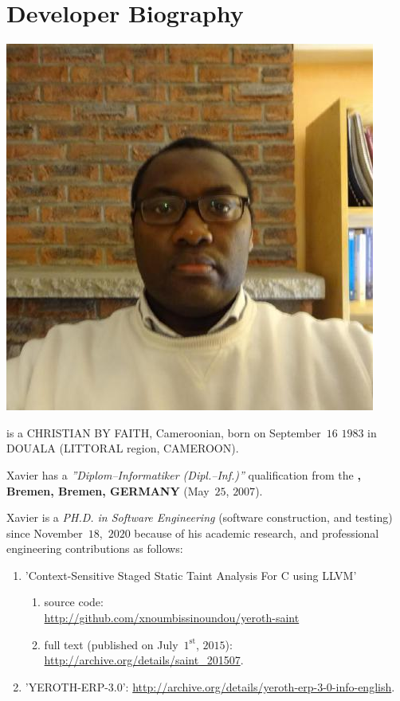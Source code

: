 \section{Developer Biography}\label{chap:biography}
\vspace{-0.9em}

\begin{center}
\includegraphics[scale=0.32]{../../francais/images/XavierNOUNDOU-2}
\end{center}

\textbf{\myfullacademicname} is a CHRISTIAN BY FAITH,
Cameroonian, born on September~$16$ $1983$ in
DOUALA (LITTORAL region, CAMEROON).

Xavier has a \textit{''Diplom--Informatiker (Dipl.--Inf.)''}
qualification from the \textbf{\unibremen, Bremen, Bremen, GERMANY} (May~$25$, $2007$).

Xavier is a \textit{PH.D. in Software Engineering}
(software construction, and testing) since November~$18$,~$2020$
because of his academic research, and professional engineering
contributions as follows:


\begin{enumerate}
	\item 'Context-Sensitive Staged Static Taint Analysis
			For C using LLVM'
		\begin{enumerate}[1.]
			\itemsep -0.7em
			\item source code: \\
			\url{http://github.com/xnoumbissinoundou/yeroth-saint}
			\item full text (published on July~$1^\text{st}$, $2015$): \url{http://archive.org/details/saint_201507}.
		\end{enumerate}		 

	\item 'YEROTH-ERP-3.0': \url{http://archive.org/details/yeroth-erp-3-0-info-english}.
\end{enumerate}
